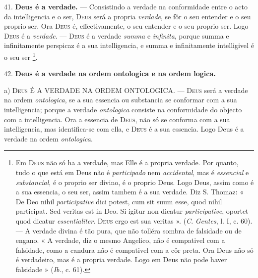  41. \textbf{Deus é a verdade.} --- Consistindo a verdade na conformidade entre o acto da intelligencia e o ser, \textsc{Deus} será a propria \emph{verdade}, se fôr o seu entender e o seu proprio ser. Ora \textsc{Deus} é, effectivamente, o seu entender e o seu proprio ser. Logo \textsc{Deus} é a \emph{verdade}. --- \textsc{Deus} é a verdade \emph{summa} e \emph{infinita}, porque summa e infinitamente perspicaz é a sua intelligencia, e summa e infinitamente intelligivel é o seu ser \footnote{Em \textsc{Deus} não só ha a verdade, mas Elle é a propria verdade. Por quanto, tudo o que está em Deus não é \emph{participado} nem \emph{accidental}, mas é \emph{essencial} e \emph{substancial}, é o proprio ser divino, é o proprio Deus. Logo Deus, assim como é a sua essencia, o seu ser, assim tambem é a sua verdade. Diz S. Thomaz: « De Deo nihil \emph{participative} dici potest, cum sit suum esse, quod nihil participat. Sed veritas est in Deo. Si igitur non dicatur \emph{participative}, oportet quod dicatur \emph{essentialiter}. \textsc{Deus} ergo est sua veritas ». (\emph{C}. \emph{Gentes}, l. I, c. 60). --- A verdade divina é tão pura, que não tolléra sombra de falsidade ou de engano. « A verdade, diz o mesmo Angelico, não é compativel com a falsidade, como a candura não é compativel com a côr preta. Ora Deus não só é verdadeiro, mas é a propria verdade. Logo em Deus não pode haver falsidade » (\emph{Ib}., c. 61).}.

42. \textbf{Deus é a verdade na ordem ontologica e na ordem logica.}

a) \textsc{Deus} É A VERDADE NA ORDEM ONTOLOGICA. --- \textsc{Deus} será a verdade na ordem \emph{ontologica}, se a sua essencia ou substancia se conformar com a sua intelligencia; porque a verdade \emph{ontologica} consiste na conformidade do objecto com a intelligencia. Ora a essencia de \textsc{Deus}, não só se conforma com a sua intelligencia, mas identifica-se com ella, e \textsc{Deus} é a sua essencia. Logo Deus é a verdade na ordem \emph{ontologica}.

